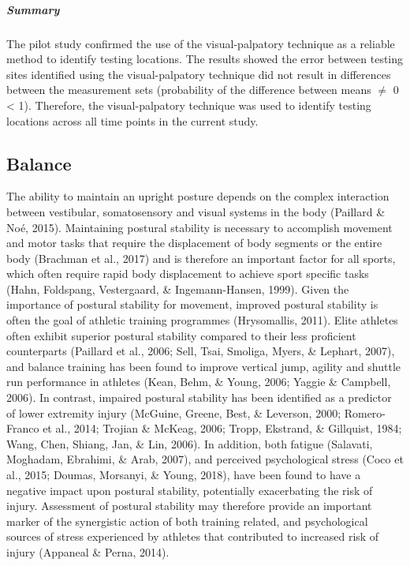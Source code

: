 \documentclass[man,floatsintext]{apa6}
\let\oldsubparagraph\subparagraph
\renewcommand{\subparagraph}[1]{\oldsubparagraph{#1}\mbox{}}
\begin{document}
\hypertarget{summary}{%
\subparagraph{Summary}\label{summary}}

The pilot study confirmed the use of the visual-palpatory technique as a reliable method to identify testing locations.
The results showed the error between testing sites identified using the visual-palpatory technique did not result in differences between the measurement sets (probability of the difference between means \(\neq\) 0 \textless{} 1).
Therefore, the visual-palpatory technique was used to identify testing locations across all time points in the current study.

\hypertarget{balance}{%
\subsection{Balance}\label{balance}}

The ability to maintain an upright posture depends on the complex interaction between vestibular, somatosensory and visual systems in the body (Paillard \& Noé, 2015).
Maintaining postural stability is necessary to accomplish movement and motor tasks that require the displacement of body segments or the entire body (Brachman et al., 2017) and is therefore an important factor for all sports, which often require rapid body displacement to achieve sport specific tasks (Hahn, Foldspang, Vestergaard, \& Ingemann-Hansen, 1999).
Given the importance of postural stability for movement, improved postural stability is often the goal of athletic training programmes (Hrysomallis, 2011). Elite athletes often exhibit superior postural stability compared to their less proficient counterparts (Paillard et al., 2006; Sell, Tsai, Smoliga, Myers, \& Lephart, 2007), and balance training has been found to improve vertical jump, agility and shuttle run performance in athletes (Kean, Behm, \& Young, 2006; Yaggie \& Campbell, 2006).
In contrast, impaired postural stability has been identified as a predictor of lower extremity injury (McGuine, Greene, Best, \& Leverson, 2000; Romero-Franco et al., 2014; Trojian \& McKeag, 2006; Tropp, Ekstrand, \& Gillquist, 1984; Wang, Chen, Shiang, Jan, \& Lin, 2006).
In addition, both fatigue (Salavati, Moghadam, Ebrahimi, \& Arab, 2007), and perceived psychological stress
(Coco et al., 2015; Doumas, Morsanyi, \& Young, 2018), have been found to have a negative impact upon postural stability, potentially exacerbating the risk of injury.
Assessment of postural stability may therefore provide an important marker of the synergistic action of both training related, and psychological sources of stress experienced by athletes that contributed to increased risk of injury (Appaneal \& Perna, 2014).
\end{document}
